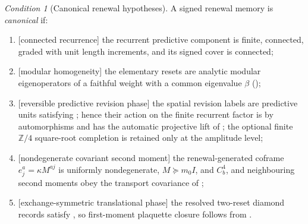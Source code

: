 \documentclass[11pt]{article}
\theoremstyle{definition}
\theoremstyle{remark}
\newcommand{\Zfour}{\mathbb{Z}/4}
\newtheorem{axiom}{Condition}[section]
\begin{document}
\begin{axiom}[Canonical renewal hypotheses]
\label{ax:canonical}
A signed renewal memory is \emph{canonical} if:
\begin{enumerate}[label=\textup{(C\arabic*)},leftmargin=2.8em]
\item \textup{[connected recurrence]} the recurrent predictive component is
      finite, connected, graded with unit length increments, and its signed cover
      is connected;
\item \textup{[modular homogeneity]} the elementary resets are analytic modular
      eigenoperators of a faithful weight with a common eigenvalue $\beta$
      \textup{(}\textup{)};
\item \textup{[reversible predictive revision phase]} the spatial revision
      labels are predictive units satisfying ;
      hence their action on the finite recurrent factor is by automorphisms and
      has the automatic projective lift of
      ; the optional finite
      \(\Zfour\) square-root completion is retained only at the amplitude level;
\item \textup{[nondegenerate covariant second moment]} the
      renewal-generated coframe $e^a_j=\kappa M^{aj}$ is uniformly
      nondegenerate, $M\succeq m_0 I$, and $C^4_b$, and neighbouring
      second moments obey the transport covariance of
      ;
\item \textup{[exchange-symmetric translational phase]} the resolved
      two-reset diamond records satisfy , so
      first-moment plaquette closure follows from
      .
\end{enumerate}
\end{axiom}
\end{document}
